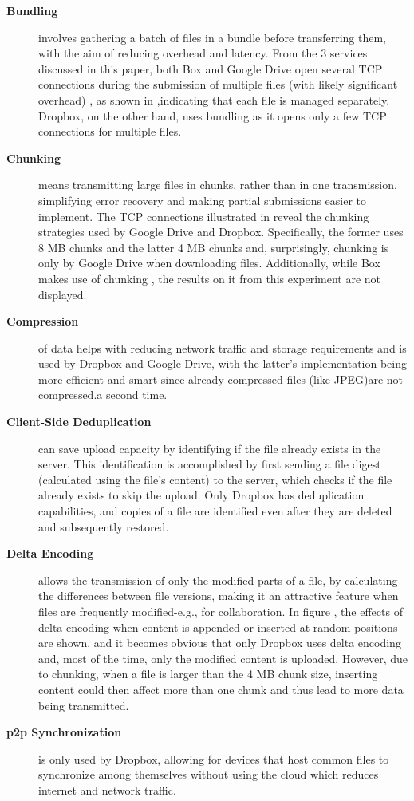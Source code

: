 \begin{description}
	\item[\textbf{Bundling}] involves gathering a batch of files in a bundle before transferring them, with the aim of reducing overhead and latency. From the 3 services discussed in this paper, both Box and Google Drive open several TCP connections during the submission of multiple files (with likely significant overhead) , as shown in  ,indicating that each file is managed separately. Dropbox, on the other hand, uses bundling as it opens only a few TCP connections for multiple files.
	
	\item[\textbf{Chunking}] means transmitting large files in chunks, rather than in one transmission, simplifying error recovery and making partial submissions easier to implement. The TCP connections illustrated in  reveal the chunking strategies used by Google Drive and Dropbox. Specifically, the former uses 8 MB chunks and the latter 4 MB chunks and, surprisingly, chunking is only by Google Drive when  downloading files. Additionally, while Box makes use of chunking , the results on it from this experiment are not displayed.
	
	\item[\textbf{Compression}] of data helps with reducing network traffic and storage requirements and is used by Dropbox and Google Drive, with the latter's implementation being more efficient and smart since already compressed files (like JPEG)are not compressed.a second time.
	
	\item[\textbf{Client-Side Deduplication}] can save upload capacity by identifying if the file already exists in the server. This identification is accomplished by first sending a file digest (calculated using the file's content) to the server, which checks if the file already exists to skip the upload.  Only Dropbox has deduplication capabilities, and copies of a file are identified even after they are deleted and subsequently restored.
	
	\item[\textbf{Delta Encoding}] allows the transmission of only the modified parts of a file, by calculating the differences between file versions, making it an attractive feature when files are frequently modified-e.g., for collaboration.  In figure  , the effects of delta encoding when content is appended or inserted at random positions are shown, and it becomes obvious that only Dropbox uses delta encoding and, most of the time, only the modified content is uploaded. However, due to chunking, when a file is larger than the 4 MB chunk size, inserting content could then affect more than one chunk and thus lead to more data being transmitted. 
	
	\item[\textbf{\ac{p2p} Synchronization}] is only used by Dropbox, allowing for devices that host common files to synchronize among themselves without using the cloud which reduces internet and network traffic.
\end{description}

